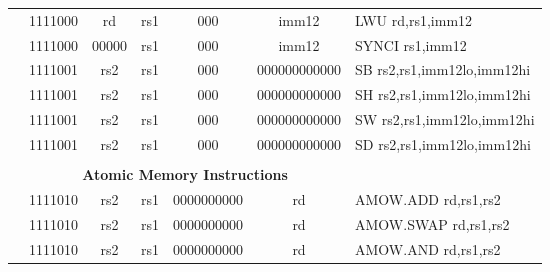 \begin{table}[p]
\begin{small}
\begin{center}
\begin{tabular}{rcccccccccccl}
&
\multicolumn{2}{|c|}{1111000} &
\multicolumn{1}{c|}{rd} &
\multicolumn{1}{c|}{rs1} &
\multicolumn{2}{c|}{000} &
\multicolumn{5}{c|}{imm12} & LWU rd,rs1,imm12 \\
\cline{2-12}
  

&
\multicolumn{2}{|c|}{1111000} &
\multicolumn{1}{c|}{00000} &
\multicolumn{1}{c|}{rs1} &
\multicolumn{2}{c|}{000} &
\multicolumn{5}{c|}{imm12} & SYNCI rs1,imm12 \\
\cline{2-12}
  

&
\multicolumn{2}{|c|}{1111001} &
\multicolumn{1}{c|}{rs2} &
\multicolumn{1}{c|}{rs1} &
\multicolumn{2}{c|}{000} &
\multicolumn{5}{c|}{000000000000} & SB rs2,rs1,imm12lo,imm12hi \\
\cline{2-12}
  

&
\multicolumn{2}{|c|}{1111001} &
\multicolumn{1}{c|}{rs2} &
\multicolumn{1}{c|}{rs1} &
\multicolumn{2}{c|}{000} &
\multicolumn{5}{c|}{000000000000} & SH rs2,rs1,imm12lo,imm12hi \\
\cline{2-12}
  

&
\multicolumn{2}{|c|}{1111001} &
\multicolumn{1}{c|}{rs2} &
\multicolumn{1}{c|}{rs1} &
\multicolumn{2}{c|}{000} &
\multicolumn{5}{c|}{000000000000} & SW rs2,rs1,imm12lo,imm12hi \\
\cline{2-12}
  

&
\multicolumn{2}{|c|}{1111001} &
\multicolumn{1}{c|}{rs2} &
\multicolumn{1}{c|}{rs1} &
\multicolumn{2}{c|}{000} &
\multicolumn{5}{c|}{000000000000} & SD rs2,rs1,imm12lo,imm12hi \\
\cline{2-12}
  

&
\multicolumn{11}{c}{} & \\
&
\multicolumn{11}{c}{\bf Atomic Memory Instructions} & \\
\cline{2-12}
  

&
\multicolumn{2}{|c|}{1111010} &
\multicolumn{1}{c|}{rs2} &
\multicolumn{1}{c|}{rs1} &
\multicolumn{6}{c|}{0000000000} &
\multicolumn{1}{c|}{rd} & AMOW.ADD rd,rs1,rs2 \\
\cline{2-12}
  

&
\multicolumn{2}{|c|}{1111010} &
\multicolumn{1}{c|}{rs2} &
\multicolumn{1}{c|}{rs1} &
\multicolumn{6}{c|}{0000000000} &
\multicolumn{1}{c|}{rd} & AMOW.SWAP rd,rs1,rs2 \\
\cline{2-12}
  

&
\multicolumn{2}{|c|}{1111010} &
\multicolumn{1}{c|}{rs2} &
\multicolumn{1}{c|}{rs1} &
\multicolumn{6}{c|}{0000000000} &
\multicolumn{1}{c|}{rd} & AMOW.AND rd,rs1,rs2 \\
\cline{2-12}
  


\end{tabular}
\end{center}
\end{small}
\end{table}
